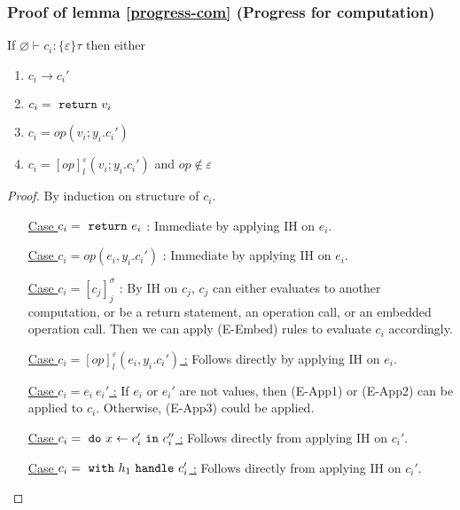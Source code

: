 \subsubsection{Proof of lemma \ref{progress-com} (Progress for computation)}
If $\varnothing \vdash c_i : \{\varepsilon\} \tau$ then either
\begin{enumerate}
\item  $c_i \longrightarrow c_i'$ 
\item  $c_i = \ \texttt{return}\  v_i$
\item $c_i = op(v_i; y_i.c_i')$
\item $c_i = [op]^\varepsilon_l(v_i; y_i.c_i')$ and  $op \not\in \varepsilon$
 \end{enumerate}
\begin{proof}
By induction on structure of $c_i$.
\begin{enumerate}[align=left]
\item[ \underline{Case $c_i = \ \texttt{return}\  e_i$} :] Immediate by applying IH on $e_i$.
\item[ \underline{Case $c_i = op(e_i, y_i.c_i')$} :] Immediate by applying IH on $e_i$.
\item[ \underline{Case $c_i = [c_j]^\sigma_j$} :] By IH on $c_j$, $c_j$ can either evaluates to another computation, or be a return statement, an operation call, or an embedded operation call. Then we can apply (E-Embed) rules to evaluate $c_i$ accordingly.
 \item[ \underline{Case $c_i = [op]^\varepsilon_l(e_i, y_i.c_i')$ :}] Follows directly by applying IH on $e_i$.
  \item[ \underline{Case $c_i =e_i\ e_i'$ :}] If $e_i$ or $e_i'$ are not values, then (E-App1) or (E-App2) can be applied to $c_i$. Otherwise, (E-App3) could be applied.
  \item[ \underline{Case $c_i = \ \texttt{do}\  x \leftarrow c_i' \ \texttt{in}\  c_i''$ :}] Follows directly from applying IH on $c_i'$.  
    \item[ \underline{Case $c_i = \ \texttt{with}\  h_1 \ \texttt{handle}\  c_i'$ :}] Follows directly from applying IH on $c_i'$.  

\end{enumerate}
\end{proof}



